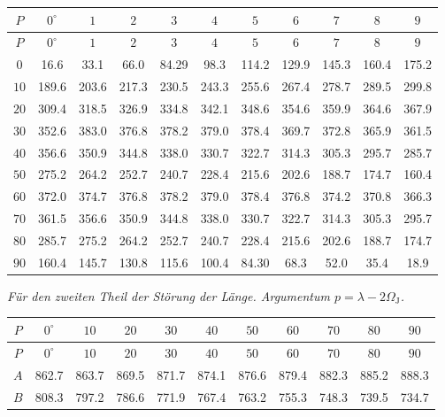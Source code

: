 \documentclass[11pt,a4paper]{book}
\begin{document}
\begin{center}
\small
\begin{longtable}{|c|c|c|c|c|c|c|c|c|c|c|}
\hline
$P$ & $0^{\circ}$ & $1$ & $2$ & $3$ & $4$ & $5$ & $6$ & $7$ & $8$ & $9$ \\
\hline
\endfirsthead
\hline
$P$ & $0^{\circ}$ & $1$ & $2$ & $3$ & $4$ & $5$ & $6$ & $7$ & $8$ & $9$ \\
\hline
\endhead
$0$ & 16.6 & 33.1 & 66.0 & 84.29 & 98.3 & 114.2 & 129.9 & 145.3 & 160.4 & 175.2 \\
$10$ & 189.6 & 203.6 & 217.3 & 230.5 & 243.3 & 255.6 & 267.4 & 278.7 & 289.5 & 299.8 \\
$20$ & 309.4 & 318.5 & 326.9 & 334.8 & 342.1 & 348.6 & 354.6 & 359.9 & 364.6 & 367.9 \\
$30$ & 352.6 & 383.0 & 376.8 & 378.2 & 379.0 & 378.4 & 369.7 & 372.8 & 365.9 & 361.5 \\
$40$ & 356.6 & 350.9 & 344.8 & 338.0 & 330.7 & 322.7 & 314.3 & 305.3 & 295.7 & 285.7 \\
$50$ & 275.2 & 264.2 & 252.7 & 240.7 & 228.4 & 215.6 & 202.6 & 188.7 & 174.7 & 160.4 \\
$60$ & 372.0 & 374.7 & 376.8 & 378.2 & 379.0 & 378.4 & 376.8 & 374.2 & 370.8 & 366.3 \\
$70$ & 361.5 & 356.6 & 350.9 & 344.8 & 338.0 & 330.7 & 322.7 & 314.3 & 305.3 & 295.7 \\
$80$ & 285.7 & 275.2 & 264.2 & 252.7 & 240.7 & 228.4 & 215.6 & 202.6 & 188.7 & 174.7 \\
$90$ & 160.4 & 145.7 & 130.8 & 115.6 & 100.4 & 84.30 & 68.3 & 52.0 & 35.4 & 18.9 \\
\hline
\end{longtable}
\end{center}

\textit{Für den zweiten Theil der Störung der Länge. Argumentum $p = \lambda - 2\Omega_{\mathrm{J}}$.}

\begin{center}
\small
\begin{longtable}{|c|c|c|c|c|c|c|c|c|c|c|}
\hline
$P$ & $0^{\circ}$ & $10$ & $20$ & $30$ & $40$ & $50$ & $60$ & $70$ & $80$ & $90$ \\
\hline
\endfirsthead
\hline
$P$ & $0^{\circ}$ & $10$ & $20$ & $30$ & $40$ & $50$ & $60$ & $70$ & $80$ & $90$ \\
\hline
\endhead
$A$ & 862.7 & 863.7 & 869.5 & 871.7 & 874.1 & 876.6 & 879.4 & 882.3 & 885.2 & 888.3 \\
$B$ & 808.3 & 797.2 & 786.6 & 771.9 & 767.4 & 763.2 & 755.3 & 748.3 & 739.5 & 734.7 \\
\hline
\end{longtable}
\end{center}
\end{document}
